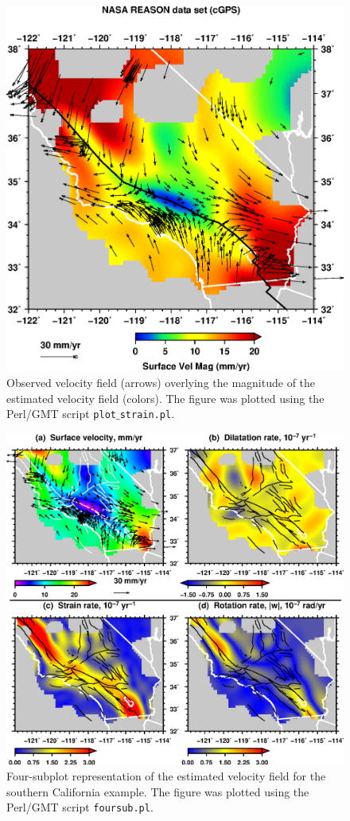 \documentclass[11pt,titlepage,fleqn]{article}
\begin{document}
\begin{figure}
\includegraphics[width=16cm]{socal_d01_q03_q07_b1_2D_s1_u1_vfield.eps}
\caption[]
{{
Observed velocity field (arrows) overlying the magnitude of the estimated velocity field (colors).
The figure was plotted using the Perl/GMT script {\tt plot$\_$strain.pl}.
\label{fig:2D_gmt1}
}}
\end{figure}

\begin{figure}
\includegraphics[width=16cm]{foursub_06_m1.eps}
\caption[]
{{
Four-subplot representation of the estimated velocity field for the southern California example.
The figure was plotted using the Perl/GMT script {\tt foursub.pl}.
\label{fig:2D_gmt2}
}}
\end{figure}

\end{document}
